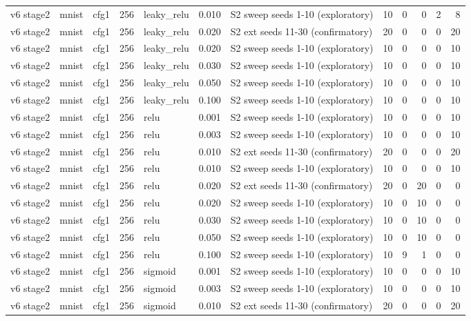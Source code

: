 \begin{table}[htbp]
{\begin{tabular}{@{}lllrlrlrrrrr@{}}
v6 stage2 & mnist & cfg1 & 256 & leaky\_relu & 0.010 & S2 sweep seeds 1-10 (exploratory) & 10 & 0 & 0 & 2 & 8 \\
v6 stage2 & mnist & cfg1 & 256 & leaky\_relu & 0.020 & S2 ext seeds 11-30 (confirmatory) & 20 & 0 & 0 & 0 & 20 \\
v6 stage2 & mnist & cfg1 & 256 & leaky\_relu & 0.020 & S2 sweep seeds 1-10 (exploratory) & 10 & 0 & 0 & 0 & 10 \\
v6 stage2 & mnist & cfg1 & 256 & leaky\_relu & 0.030 & S2 sweep seeds 1-10 (exploratory) & 10 & 0 & 0 & 0 & 10 \\
v6 stage2 & mnist & cfg1 & 256 & leaky\_relu & 0.050 & S2 sweep seeds 1-10 (exploratory) & 10 & 0 & 0 & 0 & 10 \\
v6 stage2 & mnist & cfg1 & 256 & leaky\_relu & 0.100 & S2 sweep seeds 1-10 (exploratory) & 10 & 0 & 0 & 0 & 10 \\
v6 stage2 & mnist & cfg1 & 256 & relu & 0.001 & S2 sweep seeds 1-10 (exploratory) & 10 & 0 & 0 & 0 & 10 \\
v6 stage2 & mnist & cfg1 & 256 & relu & 0.003 & S2 sweep seeds 1-10 (exploratory) & 10 & 0 & 0 & 0 & 10 \\
v6 stage2 & mnist & cfg1 & 256 & relu & 0.010 & S2 ext seeds 11-30 (confirmatory) & 20 & 0 & 0 & 0 & 20 \\
v6 stage2 & mnist & cfg1 & 256 & relu & 0.010 & S2 sweep seeds 1-10 (exploratory) & 10 & 0 & 0 & 0 & 10 \\
v6 stage2 & mnist & cfg1 & 256 & relu & 0.020 & S2 ext seeds 11-30 (confirmatory) & 20 & 0 & 20 & 0 & 0 \\
v6 stage2 & mnist & cfg1 & 256 & relu & 0.020 & S2 sweep seeds 1-10 (exploratory) & 10 & 0 & 10 & 0 & 0 \\
v6 stage2 & mnist & cfg1 & 256 & relu & 0.030 & S2 sweep seeds 1-10 (exploratory) & 10 & 0 & 10 & 0 & 0 \\
v6 stage2 & mnist & cfg1 & 256 & relu & 0.050 & S2 sweep seeds 1-10 (exploratory) & 10 & 0 & 10 & 0 & 0 \\
v6 stage2 & mnist & cfg1 & 256 & relu & 0.100 & S2 sweep seeds 1-10 (exploratory) & 10 & 9 & 1 & 0 & 0 \\
v6 stage2 & mnist & cfg1 & 256 & sigmoid & 0.001 & S2 sweep seeds 1-10 (exploratory) & 10 & 0 & 0 & 0 & 10 \\
v6 stage2 & mnist & cfg1 & 256 & sigmoid & 0.003 & S2 sweep seeds 1-10 (exploratory) & 10 & 0 & 0 & 0 & 10 \\
v6 stage2 & mnist & cfg1 & 256 & sigmoid & 0.010 & S2 ext seeds 11-30 (confirmatory) & 20 & 0 & 0 & 0 & 20 \\

\end{tabular}}
\end{table}
